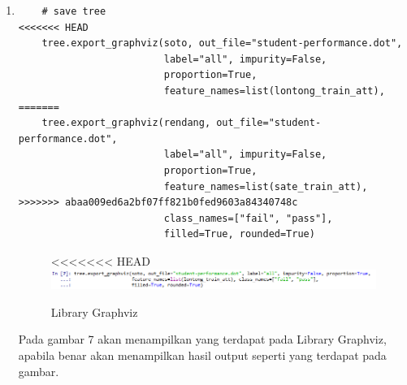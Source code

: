 \begin{enumerate}
\item
\begin{verbatim}
	# save tree
<<<<<<< HEAD
	tree.export_graphviz(soto, out_file="student-performance.dot", 
						 label="all", impurity=False, 
						 proportion=True,
	                     feature_names=list(lontong_train_att), 
=======
	tree.export_graphviz(rendang, out_file="student-performance.dot", 
						 label="all", impurity=False, 
						 proportion=True,
	                     feature_names=list(sate_train_att), 
>>>>>>> abaa009ed6a2bf07ff821b0fed9603a84340748c
	                     class_names=["fail", "pass"], 
	                     filled=True, rounded=True)
\end{verbatim}
\begin{figure}[ht]
\centering
<<<<<<< HEAD
\includegraphics[scale=0.6]{figures/lontong/7.png}
\caption{Library Graphviz}
\end{figure}
\par
	Pada gambar 7 akan menampilkan yang terdapat pada Library Graphviz, apabila benar akan menampilkan hasil output seperti yang terdapat pada gambar.


\end{enumerate}
